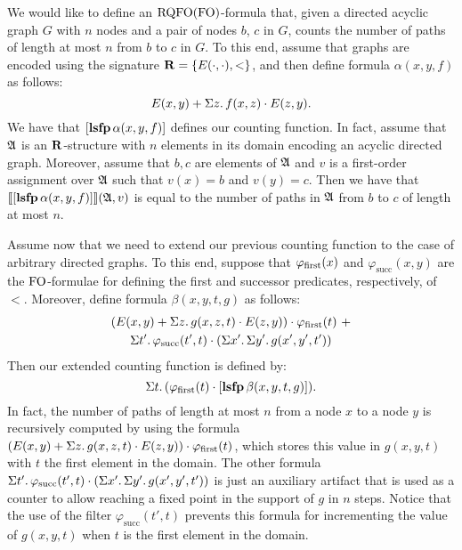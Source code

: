 \begin{example} \label{ex:count-path}
We would like to define an ${\rm RQFO}({\rm FO})$-formula that, given a directed acyclic graph $G$ with $n$ nodes and a pair of nodes $b$, $c$ in $G$, counts the number of paths of length at most $n$ from $b$ to $c$ in $G$. To this end, assume that graphs are encoded using the signature $\mathbf{R} = \{ E(\cdot,\cdot), < \}$, and then define formula $\alpha(x, y, f)$ as follows:
$$
E(x,y) + \Sigma{z}.\, f(x,z)\cdot E(z,y).
$$
We have that $[{\bf lsfp} \, \alpha(x,y,f)]$ defines our counting function. In fact, assume that $\mathfrak{A}$ is an $\mathbf{R}$-structure with $n$ elements in its domain encoding an acyclic directed graph. Moreover, assume that $b,c$ are elements of $\mathfrak{A}$ and $v$ is a first-order assignment over $\mathfrak{A}$ such that $v(x) = b$ and $v(y) = c$. Then we have that ${\llbracket{}{[{\bf lsfp} \, \alpha(x,y,f)]}\rrbracket}(\mathfrak{A},v)$ is equal to the  number of paths in $\mathfrak{A}$ from $b$ to $c$ of length at most $n$.

Assume now that we need to extend our previous counting function to the case of arbitrary directed graphs. To this end, suppose that $\varphi_{\text{\rm first}}(x)$ and $\varphi_{\text{succ}}(x,y)$ are the ${\rm FO}$-formulae for defining the first and successor predicates, respectively, of $<$. Moreover, define formula $\beta(x, y, t, g)$ as follows:
\begin{multline*}
(E(x,y) + \Sigma{z}.\, g(x,z,t)\cdot E(z,y)) \cdot \varphi_{\text{\rm first}}(t) \ +\\
\Sigma{t'}.\, \varphi_{\text{succ}}(t',t) \cdot \left(\Sigma{x'}.\, \Sigma{y'}.\, g(x',y',t') \right)
\end{multline*}
Then our extended counting function is defined by:
$$
\Sigma{t}.\, (\varphi_{\text{\rm first}}(t) \cdot [{\bf lsfp} \, \beta(x,y,t,g)]).
$$ 
In fact, the number of paths of length at most $n$ from a node $x$ to a node $y$ is recursively computed by using the formula $(E(x,y) + \Sigma{z}.\, g(x,z,t)\cdot E(z,y)) \cdot \varphi_{\text{\rm first}}(t)$, which stores this value in $g(x,y,t)$ with $t$ the first element in the domain.  The other formula $\Sigma{t'}.\, \varphi_{\text{succ}}(t',t) \cdot \left(\Sigma{x'}.\, \Sigma{y'}.\, g(x',y',t') \right)$ is just an auxiliary artifact that is used 
as a counter to allow reaching a fixed point in the support of $g$ in $n$ steps. Notice that the use of the filter $\varphi_{\text{succ}}(t',t)$ prevents this formula for incrementing the value of $g(x,y,t)$ when $t$ is the first element in the domain.
\end{example}
